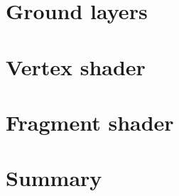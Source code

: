 \section{Ground layers}



\section{Vertex shader}



\section{Fragment shader}





\section{Summary}








